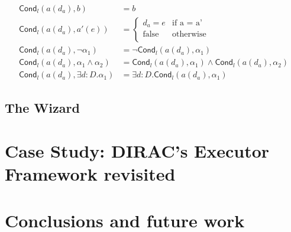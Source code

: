 \documentclass[letter]{llncs}
\newcommand{\TrA}{\ensuremath{\mathsf{Cond}}}
\begin{document}
\[
\begin{array}{ll}
\TrA_l(a(d_a),b) & = b \\
\TrA_l(a(d_a),a'(e)) & = \left \{ \begin{array}{ll} d_a = e & \text{if a = a'}\\
                                  \text{false} & \text{otherwise}\\
                                  \end{array} \right .\\
\TrA_l(a(d_a),\neg \alpha_1) & = \neg \TrA_l(a(d_a),\alpha_1) \\
\TrA_l(a(d_a),\alpha_1 \wedge \alpha_2) & =
\TrA_l(a(d_a),\alpha_1) \wedge \TrA_l(a(d_a),\alpha_2) \\
\TrA_l(a(d_a),\exists d:D.\alpha_1) & = \exists d:D. \TrA_l(a(d_a),\alpha_1)
\end{array}
\]

\subsection{The Wizard} 

\section{Case Study: DIRAC's Executor Framework revisited}
\label{sec:CaseStudy}
\section{Conclusions and future work}
\label{sec:Conclusions}

 

\end{document}
